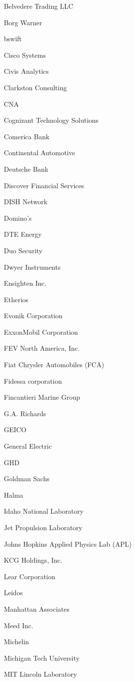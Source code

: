 \documentclass[twoside]{article}
\begin{document}
\begin{center}
\begin{multicols}{5}
\begin{FlushLeft}
\begin{compactitem}
\item Belvedere Trading LLC
\item Borg Warner
\item bswift
\item Cisco Systems
\item Civis Analytics
\item Clarkston Consulting
\item CNA
\item Cognizant Technology Solutions
\item Comerica Bank
\item Continental Automotive
\item Deutsche Bank
\item Discover Financial Services
\item DISH Network
\item Domino's
\item DTE Energy
\item Duo Security
\item Dwyer Instruments
\item Ensighten Inc.
\item Etherios
\item Evonik Corporation
\item ExxonMobil Corporation
\item FEV North America, Inc.
\item Fiat Chrysler Automobiles (FCA)
\item Fidessa corporation
\item Fincantieri Marine Group
\item G.A. Richards
\item GEICO
\item General Electric
\item GHD
\item Goldman Sachs
\item Halma
\item Idaho National Laboratory
\item Jet Propulsion Laboratory
\item Johns Hopkins Applied Physics Lab (APL)
\item KCG Holdings, Inc.
\item Lear Corporation
\item Leidos
\item Manhattan Associates
\item Meed Inc.
\item Michelin
\item Michigan Tech University
\item MIT Lincoln Laboratory

\end{compactitem}
\end{FlushLeft}
\end{multicols}
\end{center}
\end{document}
